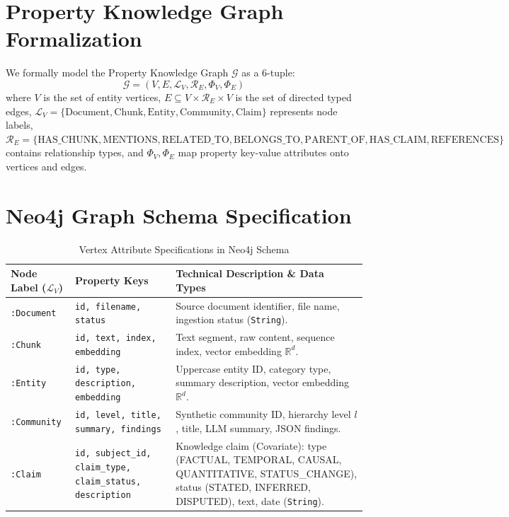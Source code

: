 \documentclass[11pt,a4paper]{report}
\begin{document}
\section{Property Knowledge Graph Formalization}
We formally model the Property Knowledge Graph $\mathcal{G}$ as a 6-tuple:
\begin{equation}
\mathcal{G} = \left( V, E, \mathcal{L}_V, \mathcal{R}_E, \Phi_V, \Phi_E \right)
\end{equation}
where $V$ is the set of entity vertices, $E \subseteq V \times \mathcal{R}_E \times V$ is the set of directed typed edges, $\mathcal{L}_V = \{\text{Document}, \text{Chunk}, \text{Entity}, \text{Community}, \text{Claim}\}$ represents node labels, $\mathcal{R}_E = \{\text{HAS\_CHUNK}, \text{MENTIONS}, \text{RELATED\_TO}, \text{BELONGS\_TO}, \text{PARENT\_OF}, \text{HAS\_CLAIM}, \text{REFERENCES}\}$ contains relationship types, and $\Phi_V, \Phi_E$ map property key-value attributes onto vertices and edges.

\section{Neo4j Graph Schema Specification}

\begin{table}[h!]
\centering
\caption{Vertex Attribute Specifications in Neo4j Schema}
\label{tab:node_schema_en}
\small
\begin{tabularx}{\textwidth}{>{\raggedright\arraybackslash}p{2.8cm} >{\raggedright\arraybackslash}p{3.8cm} X}
\toprule
\textbf{Node Label ($\mathcal{L}_V$)} & \textbf{Property Keys} & \textbf{Technical Description \& Data Types} \\
\midrule
\texttt{:Document} & \texttt{id, filename, status} & Source document identifier, file name, ingestion status (\texttt{String}). \\[0.2cm]
\texttt{:Chunk} & \texttt{id, text, index, embedding} & Text segment, raw content, sequence index, vector embedding $\mathbb{R}^d$. \\[0.2cm]
\texttt{:Entity} & \texttt{id, type, description, embedding} & Uppercase entity ID, category type, summary description, vector embedding $\mathbb{R}^d$. \\[0.2cm]
\texttt{:Community} & \texttt{id, level, title, summary, findings} & Synthetic community ID, hierarchy level $l$, title, LLM summary, JSON findings. \\[0.2cm]
\texttt{:Claim} & \texttt{id, subject\_id, claim\_type, claim\_status, description} & Knowledge claim (Covariate): type (FACTUAL, TEMPORAL, CAUSAL, QUANTITATIVE, STATUS\_CHANGE), status (STATED, INFERRED, DISPUTED), text, date (\texttt{String}). \\
\bottomrule
\end{tabularx}
\end{table}
\end{document}
